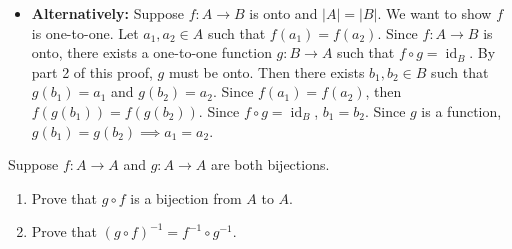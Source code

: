 \documentclass{article}
\newcommand{\id}{\operatorname{id}}
\theoremstyle{definition}
\begin{document}
\begin{solution}
\begin{itemize}
\begin{itemize}
\item \textbf{Alternatively:} Suppose $f:A\to B$ is onto and $|A|=|B|$. We want to show $f$ is one-to-one. Let $a_1,a_2\in A$ such that $f(a_1)=f(a_2)$. Since $f:A\to B$ is onto, there exists a one-to-one function $g:B\to A$ such that  $f\circ g=\id_B$. By part 2 of this proof, $g$ must be onto. Then there exists $b_1,b_2\in B$ such that $g(b_1)=a_1$ and $g(b_2)=a_2$. Since $f(a_1)=f(a_2)$, then $f(g(b_1))=f(g(b_2))$. Since $f\circ g=\id_B$, $b_1=b_2$. Since $g$ is a function, $g(b_1)=g(b_2) \implies a_1=a_2$.
\end{itemize}
\end{itemize}
\end{solution}




\begin{question}
    Suppose $f: A \rightarrow A$ and $g: A \rightarrow A$ are both bijections.
    \begin{enumerate}
    \item Prove that $g \circ f$ is a bijection from $A$ to $A$.
    \item Prove that $(g \circ f)^{-1} = f^{-1} \circ g^{-1}$.
    \end{enumerate}
\end{question}
\end{document}
